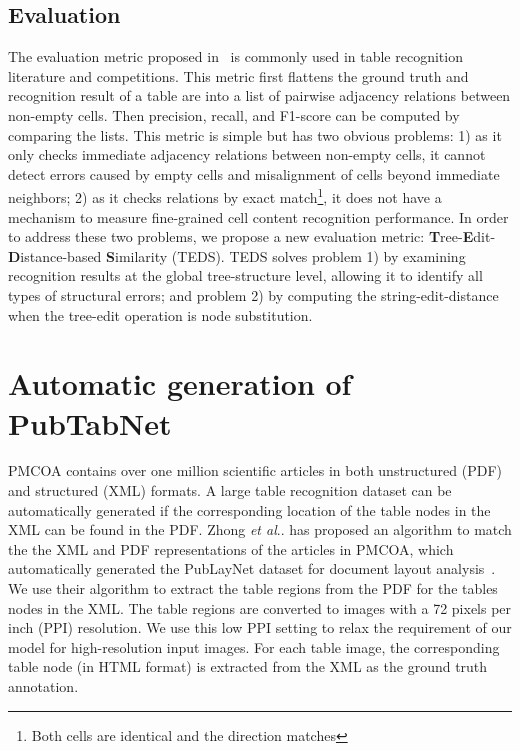 \documentclass[conference]{IEEEtran}
\makeatletter
\DeclareRobustCommand\onedot{\futurelet\@let@token\@onedot}
\def\@onedot{\ifx\@let@token.\else.\null\fi\xspace}
\def\etal{\emph{et al}\onedot}
\makeatother
\begin{document}
\subsection{Evaluation}

The evaluation metric proposed in~\cite{hurst2003constraint} is commonly used in
table recognition literature and competitions. This metric first flattens the
ground truth and recognition result of a table are into a list of pairwise
adjacency relations between non-empty cells. Then precision, recall, and
F1-score can be computed by comparing the lists. This metric is simple but has
two obvious problems: 1) as it only checks immediate adjacency relations between
non-empty cells, it cannot detect errors caused by empty cells and misalignment
of cells beyond immediate neighbors; 2) as it checks relations by exact
match\footnote{Both cells are identical and the direction matches}, it does not
have a mechanism to measure fine-grained cell content recognition performance.
In order to address these two problems, we propose a new evaluation metric:
\textbf{T}ree-\textbf{E}dit-\textbf{D}istance-based \textbf{S}imilarity (TEDS).
TEDS solves problem 1) by examining recognition results at the global
tree-structure level, allowing it to identify all types of structural errors;
and problem 2) by computing the string-edit-distance when the tree-edit
operation is node substitution.

\section{Automatic generation of PubTabNet}

PMCOA contains over one million scientific articles in both unstructured (PDF)
and structured (XML) formats. A large table recognition dataset can be
automatically generated if the corresponding location of the table nodes in the
XML can be found in the PDF. Zhong \etal has proposed an algorithm to match the
the XML and PDF representations of the articles in PMCOA, which automatically
generated the PubLayNet dataset for document layout
analysis~\cite{zhong2019publaynet}. We use their algorithm to extract the table
regions from the PDF for the tables nodes in the XML. The table regions are
converted to images with a 72 pixels per inch (PPI) resolution. We use this low
PPI setting to relax the requirement of our model for high-resolution input
images. For each table image, the corresponding table node (in HTML format) is
extracted from the XML as the ground truth annotation.
\end{document}
